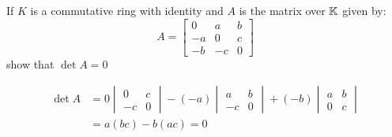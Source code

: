 \documentclass[a4paper, 10pt]{article}
\begin{document}
\begin{problem} 
If \(K\) is a commutative ring with identity and \(A\) is the matrix over \(\mathbb{K}\) given by:
\[
    A = \left[\begin{array}{ccc}
            0  & a  & b \\
            -a & 0  & c \\
            -b & -c & 0
        \end{array}\right]
\]
show that \(\det A = 0\)
\end{problem}
\begin{solution}
    \begin{align*}
        \det A & = 0 \begin{vmatrix}
                         0  & c \\
                         -c & 0
                     \end{vmatrix} - (-a) \begin{vmatrix}
                                              a  & b \\
                                              -c & 0
                                          \end{vmatrix} + (-b) \begin{vmatrix}
                                                                   a & b \\
                                                                   0 & c
                                                               \end{vmatrix} \\
               & =a(bc) - b(ac) = 0
    \end{align*}
\end{solution}
\end{document}
